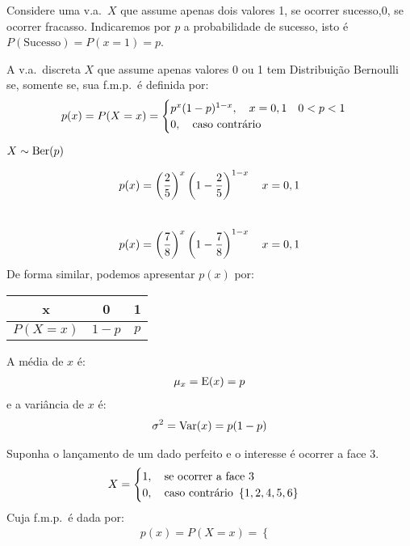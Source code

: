  \begin{description}
   \item Considere uma v.a.\ $X$ que assume apenas dois valores 1, se ocorrer sucesso,$0$, se ocorrer fracasso. Indicaremos por $p$ a probabilidade de sucesso, isto é $P(\text{Sucesso})=P(x=1)=p$.
\item [Definição:] A v.a.\ discreta $X$ que assume apenas valores 0 ou 1 tem Distribuição
 Bernoulli se, somente se, sua f.m.p.\ é definida por:
 \begin{align}
   p(x)=P(X=x)= \begin{cases}
     p^{x}(1-p)^{1-x}, \text{\quad} x=0,1 \text{\quad} 0<p<1\\
     0, \text{\quad caso contrário}
   \end{cases}
 \end{align}
\item[ Notação:] $X \sim \operatorname{Ber}(p)$
\item [Exemplos:]
  $$p(x)=\left(\frac{2}{5}\right)^x\left(1-\frac{2}{5}\right)^{1-x} \text{\quad}x=0,1$$\\
 $$p(x)=\left(\frac{7}{8}\right)^{x}\left(1-\frac{7}{8}\right)^{1-x} \text{\quad }x=0,1$$
 De forma similar, podemos apresentar $p(x)$ por:
 \begin{center}
   \begin{tabular}{c c c}
     \toprule
     x&0&1\\ \midrule
     $P(X=x)$&$1-p$&$p$\\\bottomrule
   \end{tabular}
 \end{center}
 A média de $x$ é: 
 \begin{align}
   \mu_{x}=\operatorname{E}(x)=p
 \end{align}
 e a variância de $x$ é: 
 \begin{align}
   \sigma^2 = \operatorname{Var}(x)=p (1-p)
 \end{align}
 \begin{example}Suponha o lançamento de um dado perfeito e o interesse é ocorrer a face
   3.
   \begin{align*}
     X=\begin{cases}
       1, \text{\quad se ocorrer a face 3}\\
       0, \text{\quad caso contrário } \left\{ 1,2,4,5,6 \right\}
     \end{cases}
   \end{align*}
   Cuja f.m.p.\ é dada por:
   \begin{align}
     p(x)=P(X=x)=\begin{cases}

\end{cases}
\end{align}
\end{example}
\end{description}
